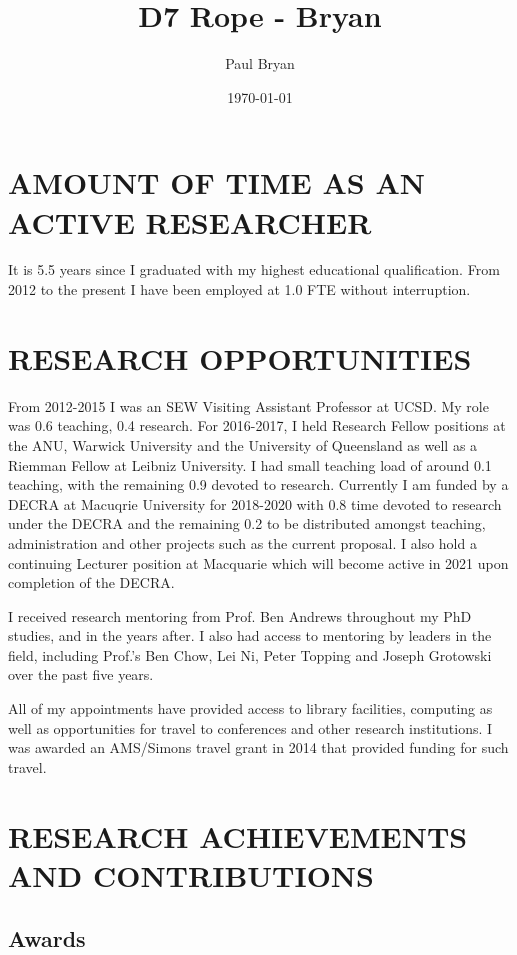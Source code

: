 \documentclass[12pt]{article}
\author{Paul Bryan}
\date{\today}
\title{D7 Rope - Bryan}
\begin{document}
\section*{AMOUNT OF TIME AS AN ACTIVE RESEARCHER}
\label{sec:orgheadline1}

It is 5.5 years since I graduated with my highest educational qualification. From 2012 to the present I have been employed at 1.0 FTE without interruption. 

\section*{RESEARCH OPPORTUNITIES}
\label{sec:orgheadline2}

From 2012-2015 I was an SEW Visiting Assistant Professor at UCSD. My role was 0.6 teaching, 0.4 research. For 2016-2017, I held Research Fellow positions at the ANU, Warwick University and the University of Queensland as well as a Riemman Fellow at Leibniz University. I had small teaching load of around 0.1 teaching, with the remaining 0.9 devoted to research. Currently I am funded by a DECRA at Macuqrie University for 2018-2020 with 0.8 time devoted to research under the DECRA and the remaining 0.2 to be distributed amongst teaching, administration and other projects such as the current proposal. I also hold a continuing Lecturer position at Macquarie which will become active in 2021 upon completion of the DECRA.

I received research mentoring from Prof. Ben Andrews throughout my PhD studies, and in the years after. I also had access to mentoring by leaders in the field, including Prof.'s Ben Chow, Lei Ni, Peter Topping and Joseph Grotowski over the past five years.

All of my appointments have provided access to library facilities, computing as well as opportunities for travel to conferences and other research institutions. I was awarded an AMS/Simons travel grant in 2014 that provided funding for such travel.

\section*{RESEARCH ACHIEVEMENTS AND CONTRIBUTIONS}
\label{sec:orgheadline8}

\subsection*{Awards}
\label{sec:orgheadline3}
\end{document}
